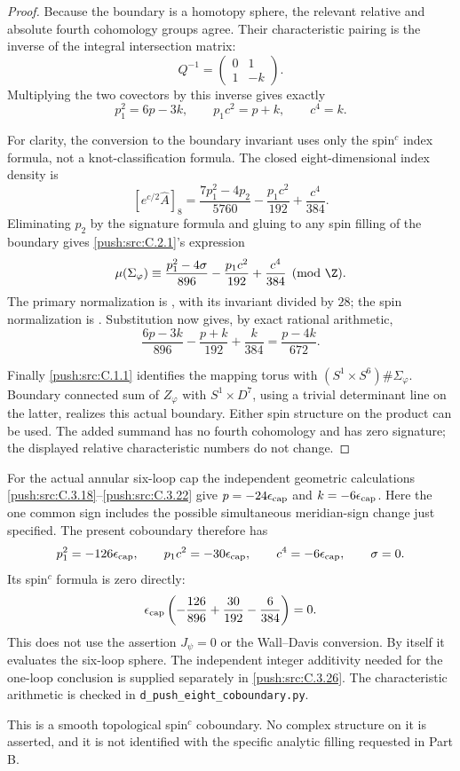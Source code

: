 \begin{proof}
Because the boundary is a homotopy sphere, the relevant relative
and absolute fourth cohomology groups agree. Their characteristic
pairing is the inverse of the integral intersection matrix:
\[
 Q^{-1}=\begin{pmatrix}0&1\\1&-k\end{pmatrix}.
\]
Multiplying the two covectors by this inverse gives exactly
\[
 p_1^2=6p-3k,\qquad p_1c^2=p+k,\qquad c^4=k.
\]

For clarity, the conversion to the boundary invariant uses only
the spin$^c$ index formula, not a knot-classification formula.
The closed eight-dimensional index density is
\[
 [e^{c/2}\widehat A]_8
 =\frac{7p_1^2-4p_2}{5760}
       -\frac{p_1c^2}{192}+\frac{c^4}{384}.
\]
Eliminating $p_2$ by the signature formula and gluing to any spin
filling of the boundary gives \ref{push:src:C.2.1}'s expression
\[
 \mu(\Sigma_\varphi)\equiv
 \frac{p_1^2-4\sigma}{896}
 -\frac{p_1c^2}{192}+\frac{c^4}{384}\pmod\Z.
\]
The primary normalization is
\citet[Section 2.2, equation (2.1)]{CrowleyNordstrom2020},
with its invariant divided by $28$; the spin normalization is
\citet[Section 6, equation (11)]{EellsKuiper1962}.
Substitution now gives, by exact rational arithmetic,
\[
 \frac{6p-3k}{896}-\frac{p+k}{192}+\frac{k}{384}
       =\frac{p-4k}{672}.
\]

Finally \ref{push:src:C.1.1} identifies the mapping torus with
$(S^1\times S^6)\#\Sigma_\varphi$. Boundary connected sum
of $Z_\varphi$ with $S^1\times D^7$, using a trivial determinant
line on the latter, realizes this actual boundary. Either spin
structure on the product can be used. The added summand has no
fourth cohomology and has zero signature; the displayed relative
characteristic numbers do not change.
\end{proof}

\begin{remark}
For the actual annular six-loop cap the independent geometric
calculations \ref{push:src:C.3.18}--\ref{push:src:C.3.22} give
$p=-24\epsilon_{\rm cap}$ and $k=-6\epsilon_{\rm cap}$.
Here the one common sign includes the possible simultaneous
meridian-sign change just specified.
The present coboundary therefore has
\[
 p_1^2=-126\epsilon_{\rm cap},\qquad
 p_1c^2=-30\epsilon_{\rm cap},\qquad
 c^4=-6\epsilon_{\rm cap},\qquad \sigma=0.
\]
Its spin$^c$ formula is zero directly:
\[
 \epsilon_{\rm cap}
 \left(-\frac{126}{896}+\frac{30}{192}
                         -\frac{6}{384}\right)=0.
\]
This does not use the assertion $J_\psi=0$ or the Wall--Davis
conversion. By itself it evaluates the six-loop sphere. The
independent integer additivity needed for the one-loop conclusion
is supplied separately in \ref{push:src:C.3.26}. The characteristic arithmetic
is checked in \texttt{d\_push\_eight\_coboundary.py}.

This is a smooth topological spin$^c$ coboundary. No complex
structure on it is asserted, and it is not identified with the
specific analytic filling requested in Part B.
\end{remark}
